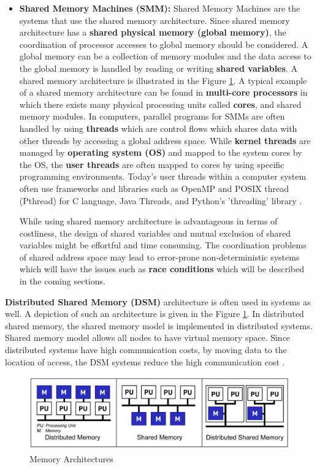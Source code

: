 \begin{itemize}
	\item \textbf{Shared Memory Machines (SMM):} Shared Memory Machines are the systems that use the shared memory architecture. Since shared memory architecture has a \textbf{shared physical memory (global memory)}, the coordination of processor accesses to global memory should be considered. A global memory can be a collection of memory modules and the data access to the global memory is handled by reading or writing \textbf{shared variables}. A shared memory architecture is illustrated in the Figure \ref{fig:memarch}. A typical example of a shared memory architecture can be found in \textbf{multi-core processors} in which there exists many physical processing units called \textbf{cores}, and shared memory modules. In computers, parallel programs for SMMs are often handled by using \textbf{threads} which are control flows which shares data with other threads by accessing a global address space. While \textbf{kernel threads} are managed by \textbf{operating system (OS)} and mapped to the system cores by the OS, the \textbf{user threads} are often mapped to cores by using specific programming environments. Today's user threads within a computer system often use frameworks and libraries such as OpenMP and POSIX thread (Pthread) for C language, Java Threads, and Python's 'threading' library \cite{springerparallel}. 
	
	While using shared memory architecture is advantageous in terms of costliness, the design of shared variables and mutual exclusion of shared variables might be effortful and time consuming. The coordination problems of shared address space may lead to error-prone non-deterministic systems which will have the issues such as \textbf{race conditions} which will be described in the coming sections. 
\end{itemize}
\textbf{Distributed Shared Memory (DSM)} architecture is often used in systems as well. A depiction of such an architecture is given in the Figure \ref{fig:memarch}. In distributed shared memory, the shared memory model is implemented in distributed systems. Shared memory model allows all nodes to have virtual memory space. Since distributed systems have high communication costs, by moving data to the location of access, the DSM systems reduce the high communication cost \cite{dsm}. 
\begin{figure}[!ht]
	\centering
	\captionsetup{justification=centering}
	\includegraphics[width=\textwidth]{content/images/memarch.png}
	\caption{Memory Architectures \cite{lukas1}}
	\label{fig:memarch}
\end{figure}

